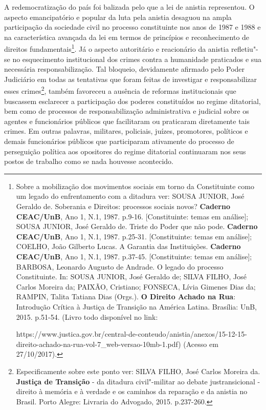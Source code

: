 A redemocratização do país foi balizada pelo que a lei de anistia
representou. O aspecto emancipatório e popular da luta pela anistia
desaguou na ampla participação da sociedade civil no processo
constituinte nos anos de 1987 e 1988 e na característica avançada da lei
em termos de princípios e reconhecimento de direitos
fundamentais\footnote{Sobre a mobilização dos movimentos sociais em
  torno da Constituinte como um legado do enfrentamento com a ditadura
  ver: SOUSA JUNIOR, José Geraldo de. Soberania e Direitos: processos
  sociais novos? \textbf{Caderno CEAC/UnB}, Ano 1, N.1, 1987. p.9-16.
  {[}Constituinte: temas em análise{]}; SOUSA JUNIOR, José Geraldo de.
  Triste do Poder que não pode. \textbf{Caderno CEAC/UnB}, Ano 1, N.1,
  1987. p.25-31. {[}Constituinte: temas em análise{]}; COELHO, João
  Gilberto Lucas. A Garantia das Instituições. \textbf{Caderno
  CEAC/UnB}, Ano 1, N.1, 1987. p.37-45. {[}Constituinte: temas em
  análise{]}; BARBOSA, Leonardo Augusto de Andrade. O legado do processo
  Constituinte. In: SOUSA JUNIOR, José Geraldo de; SILVA FILHO, José
  Carlos Moreira da; PAIXÃO, Cristiano; FONSECA, Lívia Gimenes Dias da;
  RAMPIN, Talita Tatiana Dias (Orgs.). \textbf{O Direito Achado na Rua}:
  Introdução Crítica à Justiça de Transição na América Latina. Brasília:
  UnB, 2015. p.51-54. (Livro todo disponível no link:

  https://www.justica.gov.br/central-de-conteudo/anistia/anexos/15-12-15-direito-achado-na-rua-vol-7\_web-versao-10mb-1.pdf)
  (Acesso em 27/10/2017).}. Já o aspecto autoritário e reacionário
da anistia refletiu"-se no esquecimento institucional dos crimes contra a
humanidade praticados e sua necessária responsabilização. Tal bloqueio,
devidamente afirmado pelo Poder Judiciário em todas as tentativas que
foram feitas de investigar e responsabilizar esses crimes\footnote{Especificamente
  sobre este ponto ver: SILVA FILHO, José Carlos Moreira da.
  \textbf{Justiça de Transição} - da ditadura civil"-militar ao debate
  justransicional - direito à memória e à verdade e os caminhos da
  reparação e da anistia no Brasil. Porto Alegre: Livraria do Advogado,
  2015. p.237-260.}, também favoreceu a ausência de reformas
institucionais que buscassem esclarecer a participação dos poderes
constituídos no regime ditatorial, bem como de processos de
responsabilização administrativa e judicial sobre os agentes e
funcionários públicos que facilitaram ou praticaram diretamente tais
crimes. Em outras palavras, militares, policiais, juízes, promotores,
políticos e demais funcionários públicos que participaram ativamente do
processo de perseguição política aos opositores do regime ditatorial
continuaram nos seus postos de trabalho como se nada houvesse
acontecido.

